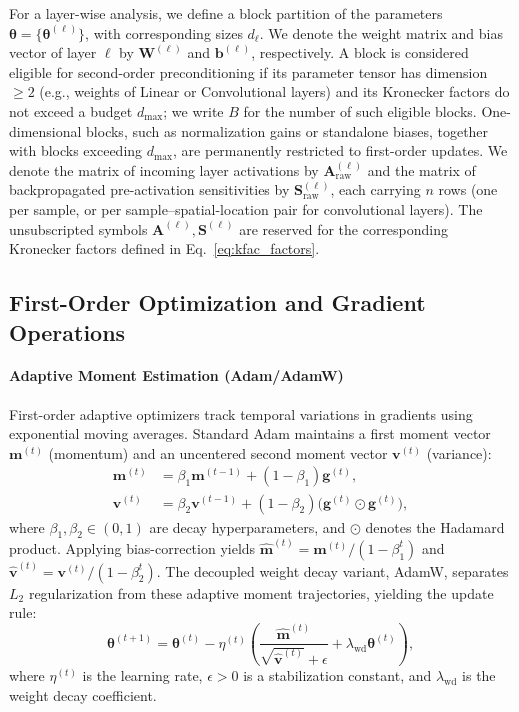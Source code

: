 \documentclass[conference]{IEEEtran}
\begin{document}
For a layer-wise analysis, we define a block partition of the parameters $\boldsymbol{\theta} = \{\boldsymbol{\theta}^{(\ell)}\}$, with corresponding sizes $d_\ell$. We denote the weight matrix and bias vector of layer $\ell$ by $\mathbf{W}^{(\ell)}$ and $\mathbf{b}^{(\ell)}$, respectively. A block is considered eligible for second-order preconditioning if its parameter tensor has dimension $\ge 2$ (e.g., weights of Linear or Convolutional layers) and its Kronecker factors do not exceed a budget $d_{\mathrm{max}}$; we write $B$ for the number of such eligible blocks. One-dimensional blocks, such as normalization gains or standalone biases, together with blocks exceeding $d_{\mathrm{max}}$, are permanently restricted to first-order updates. We denote the matrix of incoming layer activations by $\mathbf{A}^{(\ell)}_{\mathrm{raw}}$ and the matrix of backpropagated pre-activation sensitivities by $\mathbf{S}^{(\ell)}_{\mathrm{raw}}$, each carrying $n$ rows (one per sample, or per sample--spatial-location pair for convolutional layers). The unsubscripted symbols $\mathbf{A}^{(\ell)}, \mathbf{S}^{(\ell)}$ are reserved for the corresponding Kronecker factors defined in Eq.~\eqref{eq:kfac_factors}.

\subsection{First-Order Optimization and Gradient Operations}
\label{subsec:first_order_bg}

\paragraph{Adaptive Moment Estimation (Adam/AdamW)} First-order adaptive optimizers track temporal variations in gradients using exponential moving averages. Standard Adam maintains a first moment vector $\mathbf{m}^{(t)}$ (momentum) and an uncentered second moment vector $\mathbf{v}^{(t)}$ (variance):
\begin{align}
\mathbf{m}^{(t)} &= \beta_1 \mathbf{m}^{(t-1)} + (1-\beta_1)\mathbf{g}^{(t)}, \\
\mathbf{v}^{(t)} &= \beta_2 \mathbf{v}^{(t-1)} + (1-\beta_2)\bigl(\mathbf{g}^{(t)} \odot \mathbf{g}^{(t)}\bigr),
\label{eq:moments}
\end{align}
where $\beta_1, \beta_2 \in (0, 1)$ are decay hyperparameters, and $\odot$ denotes the Hadamard product. Applying bias-correction yields $\hat{\mathbf{m}}^{(t)} = \mathbf{m}^{(t)} / (1-\beta_1^t)$ and $\hat{\mathbf{v}}^{(t)} = \mathbf{v}^{(t)} / (1-\beta_2^t)$. The decoupled weight decay variant, AdamW, separates $L_2$ regularization from these adaptive moment trajectories, yielding the update rule:
\begin{equation}
\boldsymbol{\theta}^{(t+1)} = \boldsymbol{\theta}^{(t)} - \eta^{(t)} \left( \frac{\hat{\mathbf{m}}^{(t)}}{\sqrt{\hat{\mathbf{v}}^{(t)}}+\epsilon} + \lambda_{\mathrm{wd}}\boldsymbol{\theta}^{(t)} \right),
\label{eq:adamw_update}
\end{equation}
where $\eta^{(t)}$ is the learning rate, $\epsilon > 0$ is a stabilization constant, and $\lambda_{\mathrm{wd}}$ is the weight decay coefficient.
\end{document}
